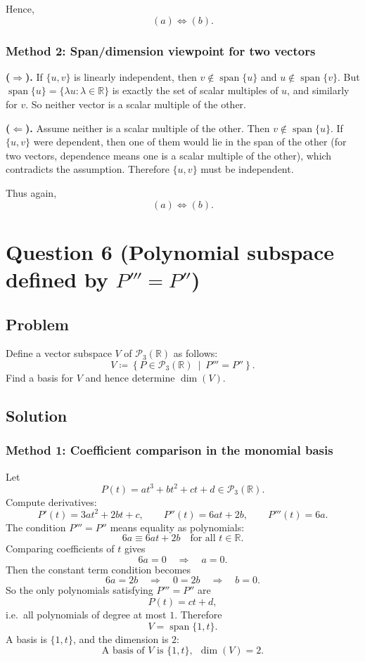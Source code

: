 \documentclass[12pt]{article}
\newcommand{\R}{\mathbb{R}}
\newcommand{\Span}{\operatorname{span}}
\newcommand{\Pthree}{\mathcal{P}_3(\R)}
\begin{document}
Hence,
\[
\boxed{\ (a)\Longleftrightarrow (b).\ }
\]

\subsubsection{Method 2: Span/dimension viewpoint for two vectors}
\textbf{(\(\Rightarrow\)).}
If \(\{u,v\}\) is linearly independent, then \(v\notin \Span\{u\}\) and \(u\notin \Span\{v\}\).
But \(\Span\{u\}=\{\lambda u:\lambda\in\R\}\) is exactly the set of scalar multiples of \(u\), and similarly for \(v\).
So neither vector is a scalar multiple of the other.

\textbf{(\(\Leftarrow\)).}
Assume neither is a scalar multiple of the other.
Then \(v\notin \Span\{u\}\).
If \(\{u,v\}\) were dependent, then one of them would lie in the span of the other (for two vectors, dependence means one is a scalar multiple of the other), which contradicts the assumption.
Therefore \(\{u,v\}\) must be independent.

Thus again,
\[
\boxed{\ (a)\Longleftrightarrow (b).\ }
\]

\newpage
\section{Question 6 (Polynomial subspace defined by \(P'''=P''\))}
\subsection{Problem}
Define a vector subspace \(V\) of \(\Pthree\) as follows:
\[
V \coloneqq \left\{P\in \Pthree \ \middle|\ P'''=P'' \right\}.
\]
Find a basis for \(V\) and hence determine \(\dim(V)\).

\subsection{Solution}

\subsubsection{Method 1: Coefficient comparison in the monomial basis}
Let
\[
P(t)=at^3+bt^2+ct+d\in \Pthree.
\]
Compute derivatives:
\[
P'(t)=3at^2+2bt+c,\qquad
P''(t)=6at+2b,\qquad
P'''(t)=6a.
\]
The condition \(P'''=P''\) means equality as polynomials:
\[
6a \equiv 6at+2b\quad\text{for all }t\in\R.
\]
Comparing coefficients of \(t\) gives
\[
6a=0\quad\Longrightarrow\quad a=0.
\]
Then the constant term condition becomes
\[
6a=2b \quad\Longrightarrow\quad 0=2b \quad\Longrightarrow\quad b=0.
\]
So the only polynomials satisfying \(P'''=P''\) are
\[
P(t)=ct+d,
\]
i.e.\ all polynomials of degree at most \(1\).
Therefore
\[
V=\Span\{1,t\}.
\]
A basis is \(\{1,t\}\), and the dimension is \(2\):
\[
\boxed{\,\text{A basis of }V\text{ is }\{1,t\},\ \ \dim(V)=2.\,}
\]
\end{document}
